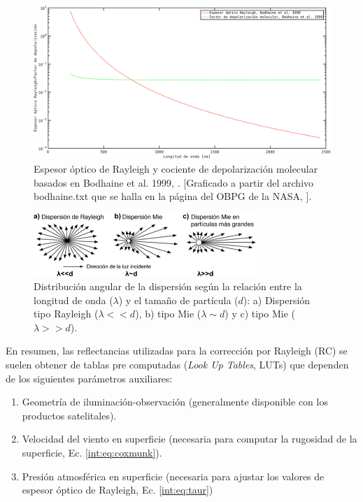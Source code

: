     \begin{figure}
    \centering
    \includegraphics[width=\textwidth]{int/figures/rayleigh_tau_depol.png}
    \caption[Espesor óptico de Rayleigh y cociente de depolarización molecular.]{Espesor óptico de Rayleigh y cociente de depolarización molecular basados en Bodhaine et al. 1999, \cite{bodhaine1999}. [Graficado a partir del archivo bodhaine.txt que se halla en la página del OBPG de la NASA, \cite{obpg}].}
    \label{int:rayleigh_tau_depol}
    \end{figure}

    \begin{figure}
    \centering
    \includegraphics[width=0.75\textwidth]{int/figures/scatteringTypes.png}
    \caption[Distribución angular de la dispersión según la relación entre la longitud de onda y el tamaño de partícula.]{Distribución angular de la dispersión según la relación entre la longitud de onda ($\lambda$) y el tamaño de partícula ($d$): a) Dispersión tipo Rayleigh ($\lambda<<d$), b) tipo Mie ($\lambda \sim d$) y c) tipo Mie ($\lambda>>d$).}
    \label{int:scatteringTypes}
    \end{figure}

    En resumen, las reflectancias utilizadas para la corrección por Rayleigh (RC) se suelen obtener de tablas pre computadas (\textit{Look Up Tables}, LUTs) que dependen de los siguientes parámetros auxiliares:
    
    \begin{enumerate}
        \item Geometría de iluminación-observación (generalmente disponible con los productos satelitales).
        \item Velocidad del viento en superficie (necesaria para computar la rugosidad de la superficie, Ec. \ref{int:eq:coxmunk}).
        \item Presión atmosférica en superficie (necesaria para ajustar los valores de espesor óptico de Rayleigh, Ec. \ref{int:eq:taur})
    \end{enumerate}
    
